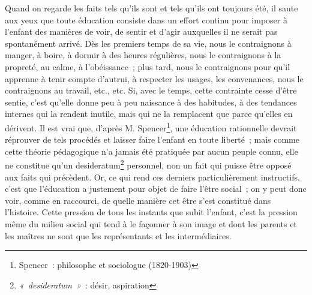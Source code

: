 
	{Quand on regarde les faits tels qu'ils sont et tels qu'ils ont toujours été, il saute aux yeux que toute éducation consiste dans un effort continu pour imposer à l'enfant des manières de voir, de sentir et d'agir auxquelles il ne serait pas spontanément arrivé. Dès les premiers temps de sa vie, nous le contraignons à manger, à boire, à dormir à des heures régulières, nous le contraignons à la propreté, au calme, à l'obéissance~; plus tard, nous le contraignons pour qu'il apprenne à tenir compte d'autrui, à respecter les usages, les convenances, nous le contraignons au travail, etc., etc. Si, avec le temps, cette contrainte cesse d'être sentie, c'est qu'elle donne peu à peu naissance à des habitudes, à des tendances internes qui la rendent inutile, mais qui ne la remplacent que parce qu'elles en dérivent. Il est vrai que, d'après M. Spencer\footnote{Spencer~: philosophe et sociologue (1820-1903)}, une éducation rationnelle devrait réprouver de tels procédés et laisser faire l'enfant en toute liberté~; mais comme cette théorie pédagogique n'a jamais été pratiquée par aucun peuple connu, elle ne constitue qu'un desideratum\footnote{\emph{«~desideratum~»}~: désir, aspiration} personnel, non un fait qui puisse être opposé aux faits qui précèdent. Or, ce qui rend ces derniers particulièrement instructifs, c'est que l'éducation a justement pour objet de faire l'être social~; on y peut donc voir, comme en raccourci, de quelle manière cet être s'est constitué dans l'histoire. Cette pression de tous les instants que subit l'enfant, c'est la pression même du milieu social qui tend à le façonner à son image et dont les parents et les maîtres ne sont que les représentants et les intermédiaires.

}

